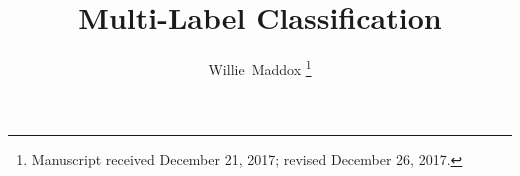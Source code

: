 \documentclass[12pt,journal,compsoc]{IEEEtran}
\begin{document}
%
\title{Multi-Label Classification}
%
%
%
%

\author{Willie~Maddox%
\thanks{Manuscript received December 21, 2017; revised December 26, 2017.}}

% 
%
\end{document}
